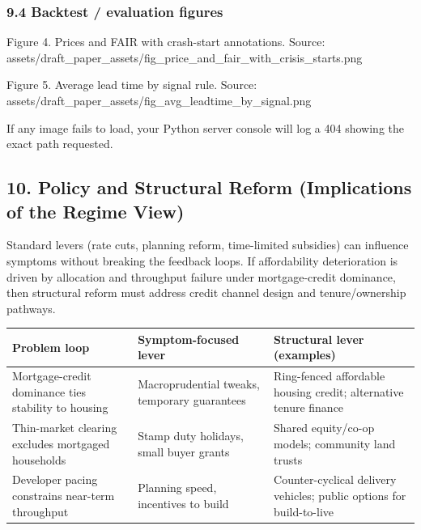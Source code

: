 \subsubsection{9.4 Backtest / evaluation
figures}\label{backtest-evaluation-figures}

Figure 4. Prices and FAIR with crash-start annotations. Source:
assets/draft\_paper\_assets/fig\_price\_and\_fair\_with\_crisis\_starts.png

Figure 5. Average lead time by signal rule. Source:
assets/draft\_paper\_assets/fig\_avg\_leadtime\_by\_signal.png

If any image fails to load, your Python server console will log a 404
showing the exact path requested.

\subsection{10. Policy and Structural Reform (Implications of the Regime
View)}\label{policy-and-structural-reform-implications-of-the-regime-view}

Standard levers (rate cuts, planning reform, time-limited subsidies) can
influence symptoms without breaking the feedback loops. If affordability
deterioration is driven by allocation and throughput failure under
mortgage-credit dominance, then structural reform must address credit
channel design and tenure/ownership pathways.

{\def\LTcaptype{none} %
\begin{longtable}[]{@{}
  >{\raggedright\arraybackslash}p{}
  >{\raggedright\arraybackslash}p{}
  >{\raggedright\arraybackslash}p{}@{}}
\toprule\noalign{}
\begin{minipage}[b]{\linewidth}\raggedright
\textbf{Problem loop}
\end{minipage} & \begin{minipage}[b]{\linewidth}\raggedright
\textbf{Symptom-focused lever}
\end{minipage} & \begin{minipage}[b]{\linewidth}\raggedright
\textbf{Structural lever (examples)}
\end{minipage} \\
\midrule\noalign{}
\endhead
\bottomrule\noalign{}
\endlastfoot
Mortgage-credit dominance ties stability to housing & Macroprudential
tweaks, temporary guarantees & Ring-fenced affordable housing credit;
alternative tenure finance \\
Thin-market clearing excludes mortgaged households & Stamp duty
holidays, small buyer grants & Shared equity/co-op models; community
land trusts \\
Developer pacing constrains near-term throughput & Planning speed,
incentives to build & Counter-cyclical delivery vehicles; public options
for build-to-live \\
\end{longtable}
}

